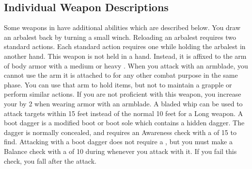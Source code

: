   \subsection{Individual Weapon Descriptions}
    Some weapons in  have additional abilities which are described below.
     You draw an arbalest back by turning a small winch. Reloading an arbalest requires two standard actions.
    Each standard action requires one  while holding the arbalest in another hand.
     This weapon is not held in a hand.
    Instead, it is affixed to the arm of body armor with a medium or heavy .
    When you attack with an armblade, you cannot use the arm it is attached to for any other combat purpose in the same phase.
    You can use that arm to hold items, but not to maintain a grapple or perform similar actions.
    If you are not proficient with this weapon, you increase your  by 2 when wearing armor with an armblade.
     A bladed whip can be used to attack targets within 15 feet instead of the normal 10 feet for a Long weapon.
     A boot dagger is a modified boot or boot sole which contains a hidden dagger.
    The dagger is normally concealed, and requires an Awareness check with a  of 15 to find.
    Attacking with a boot dagger does not require a , but you must make a Balance check with a  of 10 during whenever you attack with it.
    If you fail this check, you fall \prone after the attack.

